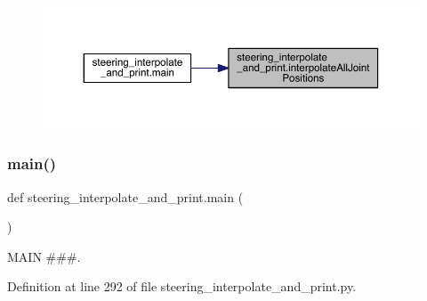 \begin{figure}[H]
\begin{center}
\leavevmode
\includegraphics[width=350pt]{namespacesteering__interpolate__and__print_ae7e7cca01e99c10286aea890f5aaa0ef_icgraph}
\end{center}
\end{figure}
\mbox{\label{namespacesteering__interpolate__and__print_aa2a632b8d620697929911569ba53daf3}} 
\subsubsection{\texorpdfstring{main()}{main()}}
{\footnotesize\ttfamily def steering\+\_\+interpolate\+\_\+and\+\_\+print.\+main (\begin{DoxyParamCaption}{ }\end{DoxyParamCaption})}



M\+A\+IN \#\#\#. 



Definition at line 292 of file steering\+\_\+interpolate\+\_\+and\+\_\+print.\+py.


